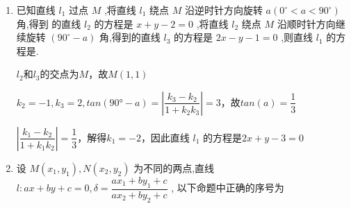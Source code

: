 \begin{enumerate}
\begin{jieda}
        在$l_1$上取点$M(0, 1)$，设$M$关于$l_2$的对称点为$M'(a, b)$，则$\vv{MM'} = (a, b - 1)$和$l_2$的方向向量$\vv{d} = (-1, 2)$垂直，且$MM'$的中点$N\left(\dfrac{a}{2}, \dfrac{b+1}{2}\right)$在直线$l_2$上，故$\left\{\begin{array}{l}
             -a+2(b-1) = 0  \\
             a + \dfrac{b+1}{2} - 4 = 0
        \end{array}\right.$，故$M'\left(\dfrac{12}{5}, \dfrac{11}{5}\right)$

        直线$l$即直线$M'P$，因此直线$l: x-7y+13=0$
    \end{jieda}
    \item 已知直线 ${l}_{1}$ 过点 $M$ ,将直线 ${l}_{1}$ 绕点 $M$ 沿逆时针方向旋转 $a\left( {{0}^{ \circ  } < a < {90}^{ \circ  }}\right)$ 角,得到 的直线 ${l}_{2}$ 的方程是 $x + y - 2 = 0$ ,将直线 ${l}_{2}$ 绕点 $M$ 沿顺时针方向继续旋转 $\left( {{90}^{ \circ  } - a}\right)$ 角,得到的直线 ${l}_{3}$ 的方程是 ${2x} - y - 1 = 0$ ,则直线 ${l}_{1}$ 的方程是.
    \begin{jieda}
        $l_2$和$l_3$的交点为$M$，故$M(1, 1)$

        $k_2 = -1, k_3 = 2, tan(\ang{90} - a) = \left|\dfrac{k_3-k_2}{1+k_2k_3}\right| = 3$，故$tan(a) = \dfrac{1}{3}$
        
        $\left|\dfrac{k_1-k_2}{1+k_1k_2}\right| = \dfrac{1}{3}$，解得$k_1 = -2$，因此直线 ${l}_{1}$ 的方程是$2x+y-3 = 0$
    \end{jieda}
    \item 设 $M\left( {{x}_{1},{y}_{1}}\right) ,N\left( {{x}_{2},{y}_{2}}\right)$ 为不同的两点,直线 $l : {ax} + {by} + c = 0,\delta  = \dfrac{a{x}_{1} + b{y}_{1} + c}{a{x}_{2} + b{y}_{2} + c}$ , 以下命题中正确的序号为


\end{enumerate}
